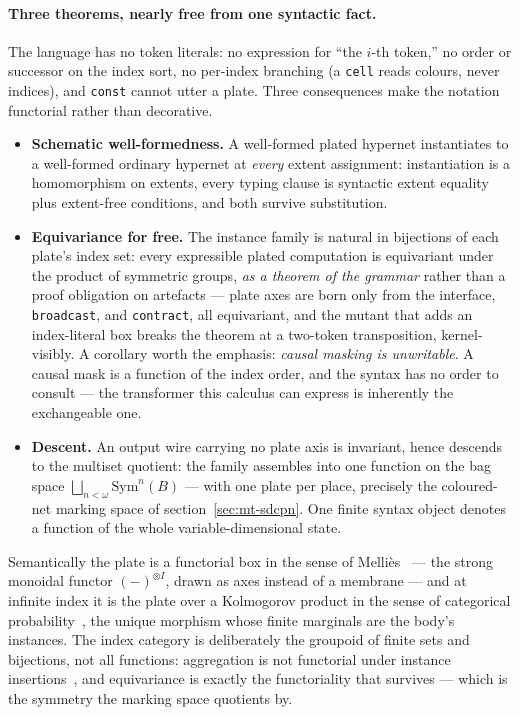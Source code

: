 \paragraph{Three theorems, nearly free from one syntactic fact.} The
language has no token literals: no expression for ``the $i$-th
token,'' no order or successor on the index sort, no per-index
branching (a \texttt{cell} reads colours, never indices), and
\texttt{const} cannot utter a plate. Three consequences make the
notation functorial rather than decorative.

\begin{itemize}
\item \textbf{Schematic well-formedness.} A well-formed plated
  hypernet instantiates to a well-formed ordinary hypernet at
  \emph{every} extent assignment: instantiation is a homomorphism on
  extents, every typing clause is syntactic extent equality plus
  extent-free conditions, and both survive substitution.
\item \textbf{Equivariance for free.} The instance family is natural
  in bijections of each plate's index set: every expressible plated
  computation is equivariant under the product of symmetric groups,
  \emph{as a theorem of the grammar} rather than a proof obligation
  on artefacts --- plate axes are born only from the interface,
  \texttt{broadcast}, and \texttt{contract}, all equivariant, and
  the mutant that adds an index-literal box breaks the theorem at a
  two-token transposition, kernel-visibly. A corollary worth the
  emphasis: \emph{causal masking is unwritable}. A causal mask is a
  function of the index order, and the syntax has no order to
  consult --- the transformer this calculus can express is
  inherently the exchangeable one.
\item \textbf{Descent.} An output wire carrying no plate axis is
  invariant, hence descends to the multiset quotient: the family
  assembles into one function on the bag space
  $\bigsqcup_{n < \omega} \mathrm{Sym}^n(B)$ --- with one plate per
  place, precisely the coloured-net marking space of
  section~\ref{sec:mt-sdcpn}. One finite syntax object denotes a
  function of the whole variable-dimensional state.
\end{itemize}

Semantically the plate is a functorial box in the sense of
Melliès~\cite{mellies06csl} --- the strong monoidal functor
$(-)^{\otimes I}$, drawn as axes instead of a membrane --- and at
infinite index it is the plate over a Kolmogorov product in the
sense of categorical probability~\cite{chen2024aldoushoover}, the unique morphism
whose finite marginals are the body's instances. The index category
is deliberately the groupoid of finite sets and bijections, not all
functions: aggregation is not functorial under instance
insertions~\cite{spivak2021agg}, and equivariance is exactly the
functoriality that survives --- which is the symmetry the
marking space quotients by.


